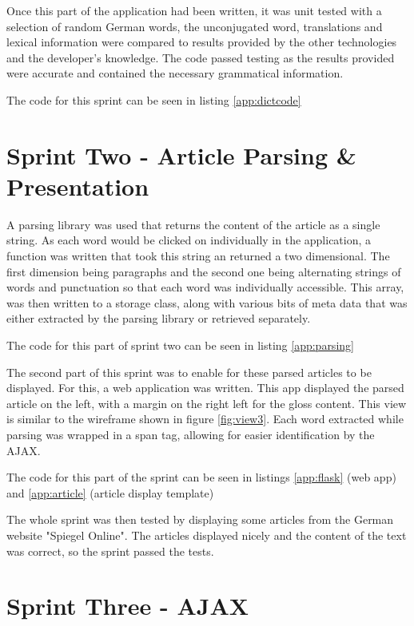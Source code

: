 Once this part of the application had been written, it was unit tested with a selection of random German words, the unconjugated word, translations and lexical information were compared to results provided by the other technologies and the developer's knowledge. The code passed testing as the results provided were accurate and contained the necessary grammatical information. 

The code for this sprint can be seen in listing \ref{app:dictcode}

\section{Sprint Two - Article Parsing \& Presentation}

A parsing library was used that returns the content of the article as a single string.  As each word would be clicked on individually in the application, a function was written that took this string an returned a two dimensional. The first dimension being paragraphs and the second one being alternating strings of words and punctuation so that each word was individually accessible. This array, was then written to a storage class, along with various bits of meta data that was either extracted by the parsing library or retrieved separately.  

The code for this part of sprint two can be seen in listing \ref{app:parsing}

The second part of this sprint was to enable for these parsed articles to be displayed. For this, a web application was written. This app displayed the parsed article on the left, with a margin on the right left for the gloss content. This view is similar to the wireframe shown in figure \ref{fig:view3}. Each word extracted while parsing was wrapped in a span tag, allowing for easier identification by the AJAX.

The code for this part of the sprint can be seen in listings \ref{app:flask} (web app) and \ref{app:article} (article display template)

The whole sprint was then tested by displaying some articles from the German website "Spiegel Online". The articles displayed nicely and the content of the text was correct, so the sprint passed the tests.

\section{Sprint Three - AJAX}

